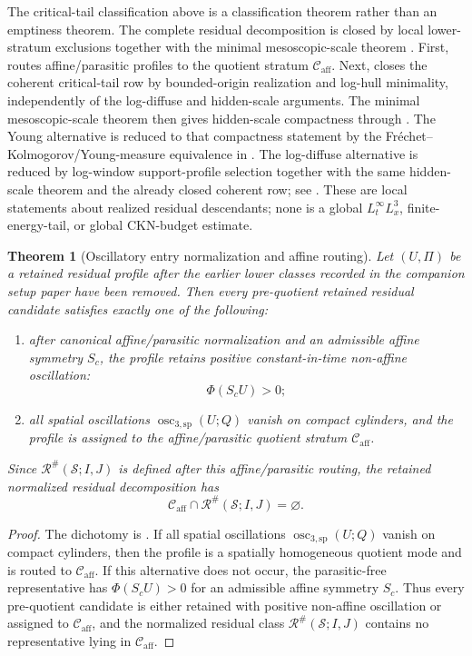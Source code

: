 \documentclass[11pt]{amsart}
\numberwithin{equation}{section}
\theoremstyle{plain}
\newtheorem{theorem}{Theorem}[section]
\theoremstyle{definition}
\theoremstyle{remark}
\newcommand{\calS}{\mathcal S}
\newcommand{\calR}{\mathcal R}
\newcommand{\Caff}{\mathcal C_{\mathrm{aff}}}
\newcommand{\MesoscopicReductionTheorem}{\Cref{thm:first-bad-mesoscopic-reduction}}
\newcommand{\oscsp}{\operatorname{osc}_{3,\mathrm{sp}}}
\begin{document}
The critical-tail classification above is a classification theorem rather than
an emptiness theorem.  The complete residual decomposition is closed by
local lower-stratum exclusions together with the minimal mesoscopic-scale
theorem \MesoscopicReductionTheorem.  First,
 routes affine/parasitic profiles to
the quotient stratum \(\Caff\).  Next,
 closes the coherent critical-tail
row by bounded-origin realization and log-hull minimality, independently of the
log-diffuse and hidden-scale arguments.  The minimal mesoscopic-scale theorem
then gives hidden-scale compactness through
.  The Young alternative is
reduced to that compactness statement by the
Fr\'echet--Kolmogorov/Young-measure equivalence in
.  The log-diffuse alternative is
reduced by log-window support-profile selection together with the same
hidden-scale theorem and the already closed coherent row; see
.  These are local
statements about realized residual descendants; none is a global
\(L^\infty_tL^3_x\), finite-energy-tail, or global CKN-budget estimate.

\begin{theorem}[Oscillatory entry normalization and affine routing]
\label{thm:oscillatory-entry-normalization}
Let \((U,\Pi)\) be a retained residual profile after the earlier lower classes
recorded in the companion setup paper have been removed.  Then every
pre-quotient retained residual candidate satisfies exactly one of the following:
\begin{enumerate}[label=\textup{(\roman*)}]
   \item after canonical affine/parasitic normalization and an admissible affine
   symmetry \(S_c\), the profile retains positive constant-in-time non-affine
   oscillation:
   \[
      \Phi(S_cU)>0;
   \]
   \item all spatial oscillations \(\oscsp(U;Q)\) vanish on compact cylinders,
   and the profile is assigned to the affine/parasitic quotient stratum
   \(\Caff\).
\end{enumerate}
Since \(\calR^\#(\calS;I,J)\) is defined after this affine/parasitic routing,
the retained normalized residual decomposition has
\[
   \Caff\cap\calR^\#(\calS;I,J)=\varnothing .
\]
\end{theorem}

\begin{proof}
The dichotomy is .  If all
spatial oscillations \(\oscsp(U;Q)\) vanish on compact cylinders, then the profile
is a spatially homogeneous quotient mode and is routed to \(\Caff\).  If this
alternative does not occur, the parasitic-free representative has
\(\Phi(S_cU)>0\) for an admissible affine symmetry \(S_c\).  Thus every
pre-quotient candidate is either retained with positive non-affine oscillation
or assigned to \(\Caff\), and the normalized residual class
\(\calR^\#(\calS;I,J)\) contains no representative lying in \(\Caff\).
\end{proof}
\end{document}
